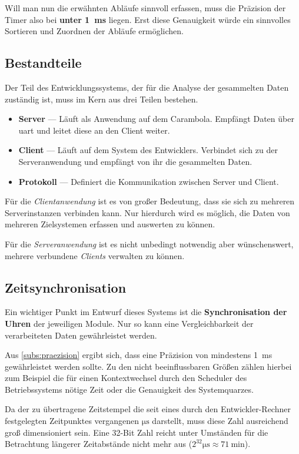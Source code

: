 Will man nun die erwähnten Abläufe sinnvoll erfassen, muss die Präzision der
Timer also bei \textbf{unter \SI{1}{\milli\second}} liegen. Erst diese
Genauigkeit würde ein sinnvolles Sortieren und Zuordnen der Abläufe ermöglichen.

\subsection{Bestandteile}\label{subs:best}
Der Teil des Entwicklungssystems, der für die Analyse der gesammelten Daten
zuständig ist, muss im Kern aus drei Teilen bestehen.
\begin{itemize}
  \item \textbf{Server} --- Läuft als Anwendung auf dem Carambola. Empfängt
  Daten über \gls{uart} und leitet diese an den Client weiter.
  \item \textbf{Client} --- Läuft auf dem System des Entwicklers. Verbindet sich
  zu der Serveranwendung und empfängt von ihr die gesammelten Daten.
  \item \textbf{Protokoll} --- Definiert die Kommunikation zwischen Server und
  Client.
\end{itemize}
Für die \emph{Clientanwendung} ist es von großer Bedeutung, dass sie sich zu
mehreren Serverinstanzen verbinden kann. Nur hierdurch wird es möglich, die
Daten von mehreren Zielsystemen erfassen und auswerten zu können.

Für die \emph{Serveranwendung} ist es nicht unbedingt notwendig aber
wünschenswert, mehrere verbundene \emph{Clients} verwalten zu können.
\subsection{Zeitsynchronisation}\label{subs:time}
Ein wichtiger Punkt im Entwurf dieses Systems ist die \textbf{Synchronisation
der Uhren} der jeweiligen Module. Nur so kann eine Vergleichbarkeit der
verarbeiteten Daten gewährleistet werden.

Aus \autoref{subs:praezision} ergibt sich, dass eine Präzision von mindestens
\SI{1}{\milli\second} gewährleistet werden sollte. Zu den nicht beeinflussbaren
Größen zählen hierbei zum Beispiel die für einen Kontextwechsel durch den
Scheduler des Betriebssystems nötige Zeit oder die Genauigkeit des
Systemquarzes.

Da der zu übertragene Zeitstempel die seit eines durch den Entwickler-Rechner
festgelegten Zeitpunktes vergangenen $\si{\micro\second}$ darstellt, muss diese
Zahl ausreichend groß dimensioniert sein. Eine 32-Bit Zahl reicht unter
Umständen für die Betrachtung längerer Zeitabstände nicht mehr aus
($2^{32}\si{\micro\second}\approx \SI{71}{\minute}$).

